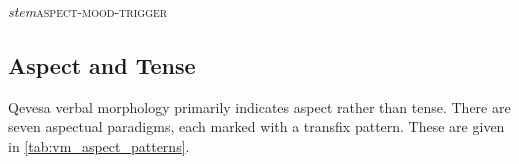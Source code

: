 \documentclass[grammar]{subfiles}
\begin{document}
  \begin{exe}
    \ex\label{exe:vm_conjugation} \textit{stem}\bs\textsc{aspect-mood-trigger}
  \end{exe}

  \subsection{Aspect and Tense}
  \label{ssec:vm_aspect_tense}
  
  
  Qevesa verbal morphology primarily indicates aspect rather than tense.  There
  are seven aspectual paradigms, each marked with a transfix pattern.  These
  are given in \cref{tab:vm_aspect_patterns}.
\end{document}

